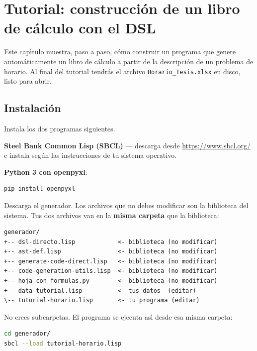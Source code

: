 \documentclass[12pt,a4paper]{report}
\begin{document}
\chapter{Tutorial: construcción de un libro de cálculo con el DSL}
\label{cap:tutorial}

Este cap\'{\i}tulo muestra, paso a paso, c\'omo construir un programa que
genere autom\'aticamente un libro de c\'alculo a partir de la descripci\'on
de un problema de horario.
Al final del tutorial tendr\'as el archivo \texttt{Horario\_Tesis.xlsx}
en disco, listo para abrir.

\section{Instalaci\'on}
\label{sec:requisitos}

Instala los dos programas siguientes.

\textbf{Steel Bank Common Lisp (SBCL)} --- descarga desde \url{https://www.sbcl.org/} e instala seg\'un las instrucciones de tu sistema operativo.

\textbf{Python 3 con openpyxl}:

\begin{lstlisting}[language=bash, numbers=none, backgroundcolor=\color{gray!10},
                   basicstyle=\ttfamily\small, keywordstyle={}]
pip install openpyxl
\end{lstlisting}

Descarga el generador.
Los archivos que no debes modificar son la biblioteca del sistema.
Tus dos archivos van en la \textbf{misma carpeta} que la biblioteca:

\begin{lstlisting}[language={}, numbers=none, backgroundcolor=\color{gray!10},
                   basicstyle=\ttfamily\small]
generador/
+-- dsl-directo.lisp            <- biblioteca (no modificar)
+-- ast-def.lisp                <- biblioteca (no modificar)
+-- generate-code-direct.lisp   <- biblioteca (no modificar)
+-- code-generation-utils.lisp  <- biblioteca (no modificar)
+-- hoja_con_formulas.py        <- biblioteca (no modificar)
+-- data-tutorial.lisp          <- tus datos  (editar)
\-- tutorial-horario.lisp       <- tu programa (editar)
\end{lstlisting}

No crees subcarpetas.
El programa se ejecuta as\'{\i} desde esa misma carpeta:

\begin{lstlisting}[language=bash, numbers=none, backgroundcolor=\color{gray!10},
                   basicstyle=\ttfamily\small, keywordstyle={}]
cd generador/
sbcl --load tutorial-horario.lisp
\end{lstlisting}
\end{document}
